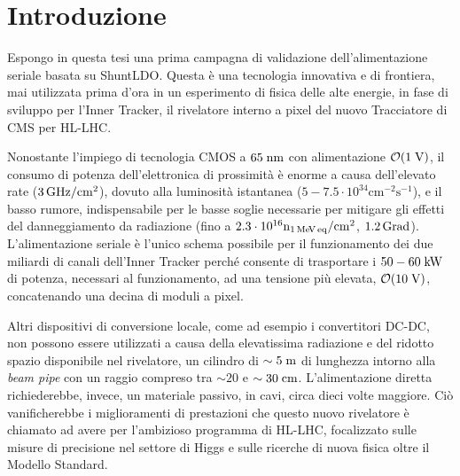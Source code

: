 \chapter{Introduzione}

Espongo in questa tesi una prima campagna di validazione dell'alimentazione seriale basata su ShuntLDO. Questa \`e una tecnologia innovativa e di frontiera, mai utilizzata prima d'ora in un esperimento di fisica delle alte energie, in fase di sviluppo per l'Inner Tracker, il rivelatore interno a pixel del nuovo Tracciatore di CMS per HL-LHC. 

Nonostante l'impiego di tecnologia CMOS a $65\rm \; nm$ con alimentazione ${\cal O}(1\rm \; V)$, il consumo di potenza dell'elettronica di prossimit\`a \`e enorme a causa dell'elevato rate ($3{\rm \, GHz}/\mathrm{cm^2}$), dovuto alla luminosit\`a istantanea ($\mathrm{5-7.5\cdot 10^{34}cm^{-2}s^{-1}}$), e il basso rumore, indispensabile per le basse soglie necessarie per mitigare gli effetti del danneggiamento da radiazione (fino a $\mathrm{2.3\cdot10^{16} n_{1{\rm \, Me\kern-0.125em V}\, eq}/cm^2}$, $1.2{\rm \, Grad}$). L'alimentazione seriale \`e l'unico schema possibile per il funzionamento dei due miliardi di canali dell'Inner Tracker perché consente di trasportare i $50-60\rm \; kW$ di potenza, necessari al funzionamento, ad una tensione pi\`u elevata, ${\cal O}(10\rm \; V)$, concatenando una decina di moduli a pixel.


Altri dispositivi di conversione locale, come ad esempio i convertitori DC-DC,
non possono essere utilizzati a causa della elevatissima radiazione e del ridotto spazio disponibile nel rivelatore, un cilindro di $\sim5\rm \; m$ di lunghezza intorno alla \textit{beam pipe} con un raggio compreso tra $\sim20$ e $\sim 30\rm \; cm$. L'alimentazione diretta richiederebbe, invece, un materiale passivo, in cavi, circa dieci volte maggiore. 
Ciò vanificherebbe i miglioramenti di prestazioni che questo nuovo rivelatore \`e chiamato ad avere per l'ambizioso programma di HL-LHC, focalizzato sulle misure di precisione nel settore di Higgs e sulle ricerche di nuova fisica oltre il Modello Standard. 


